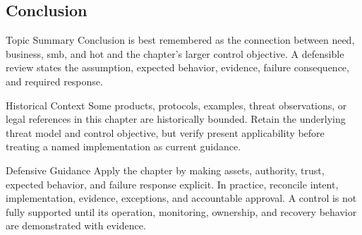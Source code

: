 \documentclass[11pt,letterpaper]{article}
\begin{document}
\subsection*{Conclusion}
\begin{CornellNotesTable}
\end{CornellNotesTable}
\begin{CornellSummaryBox}{Topic Summary}
Conclusion is best remembered as the connection between need, business, smb, and hot and the chapter's larger control objective. A defensible review states the assumption, expected behavior, evidence, failure consequence, and required response.
\end{CornellSummaryBox}
\begin{CornellWarningBox}{Historical Context}
Some products, protocols, examples, threat observations, or legal references in this chapter are historically bounded. Retain the underlying threat model and control objective, but verify present applicability before treating a named implementation as current guidance.
\end{CornellWarningBox}
\begin{CornellOverviewBox}{Defensive Guidance}
Apply the chapter by making assets, authority, trust, expected behavior, and failure response explicit. In practice, reconcile intent, implementation, evidence, exceptions, and accountable approval. A control is not fully supported until its operation, monitoring, ownership, and recovery behavior are demonstrated with evidence.
\end{CornellOverviewBox}
\end{document}

